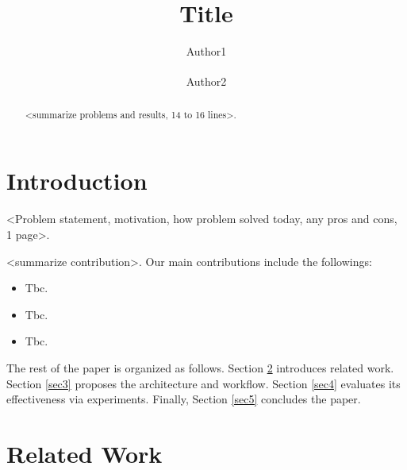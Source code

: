 \documentclass[runningheads]{llncs}
\begin{document}
%
\title{Title}
%
%
\author{Author1 \and 
Author2\textsuperscript{\Letter}}
%
%
\maketitle              %
%
\begin{abstract}
<summarize problems and results, 14 to 16 lines>. 


\end{abstract}
%
%
%
\section{Introduction}\label{sec1}

<Problem statement, motivation, how problem solved today, any pros and cons, 1 page>.

<summarize contribution>. Our main contributions include the followings: 
\begin{itemize}
    \item Tbc.
    \item Tbc.
    \item Tbc.
\end{itemize}

The rest of the paper is organized as follows. Section \ref{sec2} introduces related work. Section \ref{sec3} proposes the architecture and workflow. Section \ref{sec4} evaluates its effectiveness via experiments. Finally, Section \ref{sec5} concludes the paper.

\section{Related Work}\label{sec2}
\end{document}
